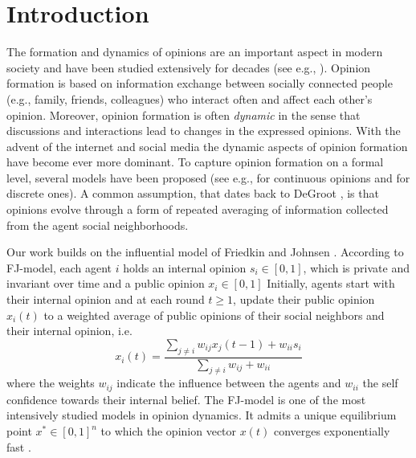 \section{Introduction}
The formation and dynamics of opinions are an important aspect in modern 
society and have been studied extensively for decades (see e.g., \cite{Jackson}).
Opinion formation is based on information exchange between socially 
connected people (e.g., family, friends, colleagues) who interact often 
and affect each other's opinion. Moreover, opinion
formation is often \emph{dynamic} in the sense that discussions and 
interactions lead to changes in the expressed opinions. With the 
advent of the internet and social media the dynamic aspects of 
opinion formation have become ever more dominant. To capture opinion formation 
on a formal level, several models have been proposed 
(see e.g., \cite{DeGroot,FJ90,HK,BKO11,GS14,BGM13} for 
continuous opinions and \cite{FGV12,YOASS13,BFM16} for discrete ones). 
A common assumption, that dates back to DeGroot \cite{DeGroot}, is 
that opinions evolve through a form of repeated averaging of 
information collected from the agent social neighborhoods.

Our work builds on the influential model of Friedkin and
Johnsen \cite{FJ90}. According to FJ-model, each agent $i$ holds an 
internal opinion $s_i\in [0,1]$, which is private and
invariant over time and a public opinion $x_i \in [0,1]$
Initially, agents start with their internal opinion and at 
each round $t\geq1$, update their public opinion
$x_i(t)$ to a weighted average of public opinions of 
their social neighbors and their internal opinion, i.e.
\[x_i(t)= \frac{\sum_{j\neq i}w_{ij}x_j(t-1) + w_{ii}s_i}{\sum_{j\neq i}w_{ij}+w_{ii}}\]
where the weights $w_{ij}$ indicate the influence between
the agents and $w_{ii}$ the self confidence towards their 
internal belief. The FJ-model is one of the most intensively studied models
in opinion dynamics. It admits a 
unique equilibrium point $x^* \in [0,1]^n$ to which
the opinion vector $x(t)$ converges exponentially fast
\cite{GS14}.

